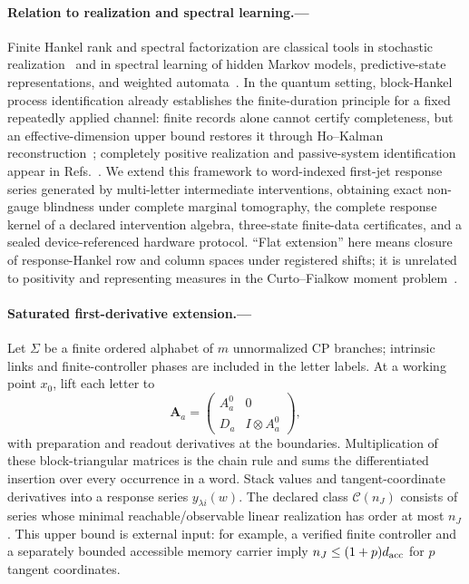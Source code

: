 \documentclass[aps,prl,reprint,superscriptaddress,nofootinbib]{revtex4-2}
\begin{document}
\paragraph{Relation to realization and spectral learning.---}
Finite Hankel rank and spectral factorization are classical tools in stochastic realization~\cite{CarlylePaz1971,ArbibManes1980} and in spectral learning of hidden Markov models, predictive-state representations, and weighted automata~\cite{Hsu2012HMM,Boots2011PSR,BalleMohri2012WFA,Balle2014WFA,BalleMohri2018WFA}.  In the quantum setting, block-Hankel process identification already establishes the finite-duration principle for a fixed repeatedly applied channel: finite records alone cannot certify completeness, but an effective-dimension upper bound restores it through Ho--Kalman reconstruction~\cite{BenninkLougovski2019QPI}; completely positive realization and passive-system identification appear in Refs.~\cite{MonrasWinter2016,GutaYamamoto2016}.  We extend this framework to word-indexed first-jet response series generated by multi-letter intermediate interventions, obtaining exact non-gauge blindness under complete marginal tomography, the complete response kernel of a declared intervention algebra, three-state finite-data certificates, and a sealed device-referenced hardware protocol.  ``Flat extension'' here means closure of response-Hankel row and column spaces under registered shifts; it is unrelated to positivity and representing measures in the Curto--Fialkow moment problem~\cite{CurtoFialkow1998}.

\paragraph{Saturated first-derivative extension.---}
Let $\Sigma$ be a finite ordered alphabet of $m$ unnormalized CP branches; intrinsic links and finite-controller phases are included in the letter labels.  At a working point $x_0$, lift each letter to
\begin{equation}
 \bm A_a=
 \begin{pmatrix}
 A_a^0&0\\ D_a&I\otimes A_a^0
 \end{pmatrix},
 \label{eq:jetlift}
\end{equation}
with preparation and readout derivatives at the boundaries.  Multiplication of these block-triangular matrices is the chain rule and sums the differentiated insertion over every occurrence in a word.  Stack values and tangent-coordinate derivatives into a response series $y_{\lambda i}(w)$.  The declared class $\mathcal C(n_J)$ consists of series whose minimal reachable/observable linear realization has order at most $n_J$.  This upper bound is external input: for example, a verified finite controller and a separately bounded accessible memory carrier imply $n_J\le(1+p)d_{\rm acc}$ for $p$ tangent coordinates.
\end{document}
